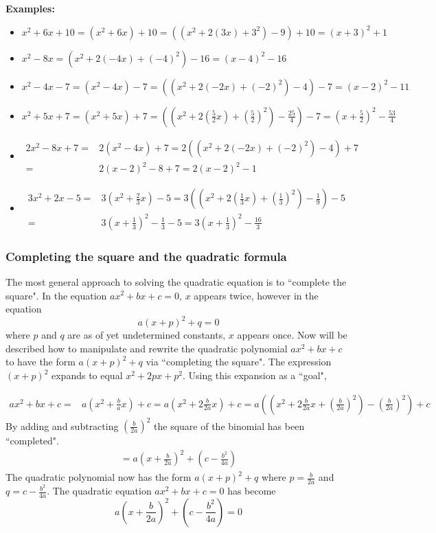 \documentclass{article}
\begin{document}
\textbf{Examples:}
\begin{itemize}
\item \(x^2 + 6x + 10 = (x^2 + 6x) + 10 = ((x^2 + 2(3x) + 3^2) - 9) + 10 = (x + 3)^2 + 1\)
\item \(x^2 - 8x = (x^2 + 2(-4x) + (-4)^2) - 16 = (x - 4)^2 - 16\)
\item \(x^2 - 4x - 7 = (x^2 - 4x) - 7 = ((x^2 + 2(-2x) + (-2)^2) - 4) - 7 = (x - 2)^2 - 11\)
\item \(x^2 + 5x + 7 = (x^2 + 5x) + 7 = ((x^2 + 2(\frac{5}{2}x) + (\frac{5}{2})^2) - \frac{25}{4}) - 7 = (x + \frac{5}{2})^2 - \frac{53}{4}\)
\item
\begin{align*}
2x^2 - 8x + 7
= & 2(x^2 - 4x) + 7 
= 2((x^2 + 2(-2x) + (-2)^2) - 4) + 7 \\
= & 2(x - 2)^2 - 8 + 7
= 2(x - 2)^2 - 1
\end{align*}
\item 
\begin{align*} 
3x^2 + 2x - 5 
= & 3(x^2 + \frac{2}{3}x) - 5 
= 3((x^2 + 2(\frac{1}{3}x) + (\frac{1}{3})^2) - \frac{1}{9}) - 5 \\
= & 3(x + \frac{1}{3})^2 - \frac{1}{3} - 5 
= 3(x + \frac{1}{3})^2 - \frac{16}{3}
\end{align*}
\end{itemize}



\subsubsection*{Completing the square and the quadratic formula}

The most general approach to solving the quadratic equation is to ``complete the square". In the equation \(ax^2 + bx + c = 0\), \(x\) appears twice, however in the equation
\[a(x + p)^2 + q = 0\]
where \(p\) and \(q\) are as of yet undetermined constants, \(x\) appears once. Now will be described how to manipulate and rewrite the quadratic polynomial \(ax^2 + bx + c\) to have the form \(a(x + p)^2 + q\) via ``completing the square". The expression \((x + p)^2\) expands to equal \(x^2 + 2px + p^2\). Using this expansion as a ``goal", 

\begin{align*}
ax^2 + bx + c 
= & a(x^2 + \frac{b}{a}x) + c 
= a(x^2 + 2\frac{b}{2a}x) + c 
= a((x^2 + 2\frac{b}{2a}x + (\frac{b}{2a})^2) - (\frac{b}{2a})^2) + c
\end{align*}
By adding and subtracting \((\frac{b}{2a})^2\) the square of the binomial has been ``completed".
\begin{align*}
= a(x + \frac{b}{2a})^2 + (c - \frac{b^2}{4a})
\end{align*}
The quadratic polynomial now has the form \(a(x + p)^2 + q\) where \(p = \frac{b}{2a}\) and \(q = c - \frac{b^2}{4a}\). The quadratic equation \(ax^2 + bx + c = 0\) has become
\[a(x + \frac{b}{2a})^2 + (c - \frac{b^2}{4a}) = 0\] 
\end{document}
